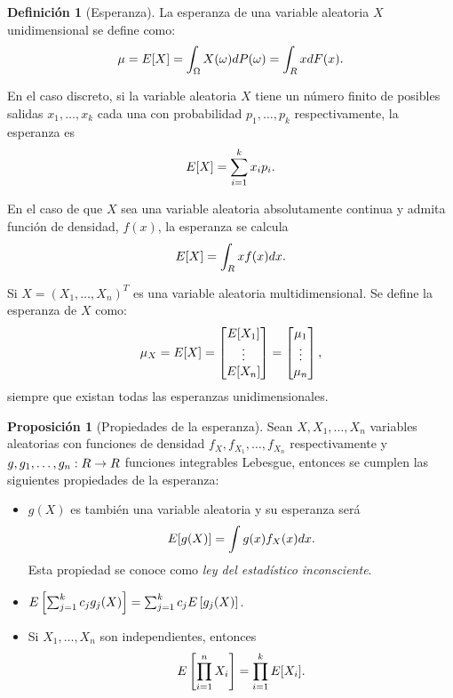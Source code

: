 \documentclass[12pt,a4paper]{report} %
\let\mathbb\relax
\theoremstyle{definition}
\newtheorem{definition}{Definición}[section]
\newtheorem{proposition}[theorem]{Proposición}
\begin{document}
\begin{definition}[Esperanza]
  La esperanza de una variable aleatoria $X$ unidimensional se define como:\[
\mu = \mathbb{E}[X] = \int_{\Omega}X(\omega)dP(\omega) = \int_{\mathbb{R}}xdF(x).
\]

En el caso discreto, si la variable aleatoria $X$ tiene un número finito de posibles salidas $x_1,\dots,x_k$ cada una con probabilidad $p_1,\dots, p_k$ respectivamente, la esperanza es\[
\mathbb{E}[X] = \sum_{i=1}^kx_ip_i.
\]

En el caso de que $X$ sea una variable aleatoria absolutamente continua y admita función de densidad, $f(x)$, la esperanza se calcula\[
\mathbb{E}[X] = \int_{\mathbb{R}}xf(x)dx.
\]
  
  Si  $X=(X_1,\dots,X_n)^T$ es una variable aleatoria multidimensional. Se define la esperanza de $X$ como:\[
\mu_X = \mathbb{E}[X] = \begin{bmatrix}
           \mathbb{E}[X_1] \\
          \vdots \\
          \mathbb{E}[X_n]
         \end{bmatrix}
 = \begin{bmatrix}
           \mu_1 \\
          \vdots \\
          \mu_n
 \end{bmatrix},  \]
 siempre que existan todas las esperanzas unidimensionales.\\
\end{definition}

\begin{proposition}[Propiedades de la esperanza]\label{p:prop_esp}
  Sean $X, X_1,\dots, X_n$ variables aleatorias con funciones de densidad $f_X,f_{X_1},\dots,f_{X_n}$ respectivamente y $g,g_1,\dots,g_n:\R\to \R$ funciones integrables Lebesgue, entonces se cumplen las siguientes propiedades de la esperanza:
  \begin{itemize}
  \item $g(X)$ es también una variable aleatoria y su esperanza será\[
\mathbb{E}[g(X)] = \int g(x)f_X(x)dx.
\]
Esta propiedad se conoce como \textit{ley del estadístico inconsciente}.
\item $\mathbb{E}\left [\sum_{j=1}^kc_jg_j(X) \right] = \sum_{j=1}^k c_j \mathbb{E} \left [ g_j(X) \right ]$.

\item Si $X_1,\dots,X_n$ son independientes, entonces\[
\mathbb{E} \left [ \prod_{i=1}^n X_i \right ] = \prod_{i=1}^k\mathbb{E}[X_i].
  \]\\[-10pt]
  \end{itemize}
  
\end{proposition}
\end{document}
